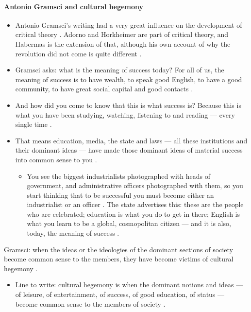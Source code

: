 \paragraph{Antonio Gramsci and cultural hegemony}
\begin{itemize}
    \item Antonio Gramsci's writing had a very great influence on the development of critical theory . Adorno and Horkheimer are part of critical theory, and Habermas is the extension of that, although his own account of why the revolution did not come is quite different .
    \item Gramsci asks: what is the meaning of success today?  For all of us, the meaning of success is to have wealth, to speak good English, to have a good community, to have great social capital and good contacts .
    \item And how did you come to know that this is what success is? Because this is what you have been studying, watching, listening to and reading --- every single time .
    \item That means education, media, the state and laws --- all these institutions and their dominant ideas --- have made those dominant ideas of material success into common sense to you .
    \begin{itemize}
        \item You see the biggest industrialists photographed with heads of government, and administrative officers photographed with them, so you start thinking that to be successful you must become either an industrialist or an officer . The state advertises this: these are the people who are celebrated; education is what you do to get in there; English is what you learn to be a global, cosmopolitan citizen --- and it is also, today, the meaning of success .
    \end{itemize}
\end{itemize}

\begin{KeyConcept}
Gramsci: when the ideas or the ideologies of the dominant sections of society become common sense to the members, they have become victims of cultural hegemony .
\begin{itemize}
    \item Line to write: cultural hegemony is when the dominant notions and ideas --- of leisure, of entertainment, of success, of good education, of status --- become common sense to the members of society .
\end{itemize}
\end{KeyConcept}

